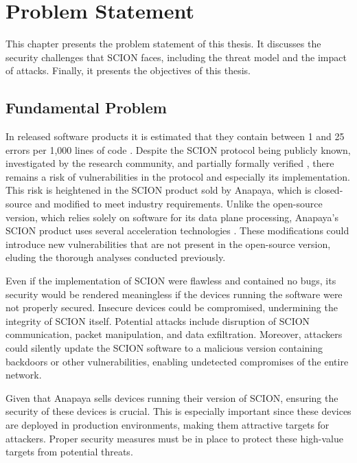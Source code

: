 \chapter{Problem Statement}
\label{ch:problem}

This chapter presents the problem statement of this thesis.
It discusses the security challenges that SCION faces, including the threat model and the impact of attacks.
Finally, it presents the objectives of this thesis.

\section{Fundamental Problem}
\label{sec:fundamental-problem}
In released software products it is estimated that they contain between 1 and 25 errors per 1,000 lines of code \cite{McConnell2004}.
Despite the SCION protocol being publicly known, investigated by the research community, and partially formally verified \cite[7, 22, 23]{Perrig2022}, there remains a risk of vulnerabilities in the protocol and especially its implementation.
This risk is heightened in the SCION product sold by Anapaya, which is closed-source and modified to meet industry requirements.
Unlike the open-source version, which relies solely on software for its data plane processing, Anapaya's SCION product uses several acceleration technologies \cite{anapayaPerformanceOptimizations}.
These modifications could introduce new vulnerabilities that are not present in the open-source version, eluding the thorough analyses conducted previously.

Even if the implementation of SCION were flawless and contained no bugs, its security would be rendered meaningless if the devices running the software were not properly secured.
Insecure devices could be compromised, undermining the integrity of SCION itself.
Potential attacks include disruption of SCION communication, packet manipulation, and data exfiltration.
Moreover, attackers could silently update the SCION software to a malicious version containing backdoors or other vulnerabilities, enabling undetected compromises of the entire network.

Given that Anapaya sells devices running their version of SCION, ensuring the security of these devices is crucial.
This is especially important since these devices are deployed in production environments, making them attractive targets for attackers.
Proper security measures must be in place to protect these high-value targets from potential threats.



